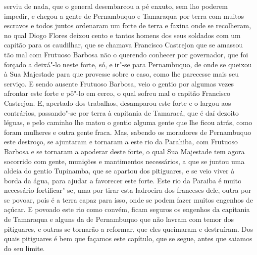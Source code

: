 \begin{linenumbers}
serviu de nada, que o general desembarcou a pé enxuto, sem lho poderem impedir, e chegou a
gente de Pernambuquo e Tamaraqua por terra com muitos escravos e todos juntos ordenaram um
forte de terra e faxina onde se recolheram, no qual Diogo Flores deixou cento e tantos
homens dos seus soldados com um capitão para os caudilhar, que se chamava Francisco
Castrejon que se amassou tão mal com Frutuoso Barbosa não o querendo conhecer por
governador, que foi forçado a deixá"-lo neste forte, só, e ir"-se para Pernambuquo, de onde
se queixou à Sua Majestade para que provesse sobre o caso, como lhe parecesse mais seu
serviço. E sendo ausente Frutuoso Barbosa, veio o gentio por algumas vezes afrontar este
forte e pô"-lo em cerco, o qual sofreu mal o capitão Francisco Castrejon. E, apertado dos
trabalhos, desamparou este forte e o largou aos contrários, passando"-se por terra à
capitania de Tamaracá, que é daí dezoito léguas, e pelo caminho lhe matou o gentio alguma
gente que lhe ficou atrás, como foram mulheres e outra gente fraca. Mas, sabendo os
moradores de Pernambuquo este destroço, se ajuntaram e tornaram a este rio da Parahiba,
com Frutuoso Barbosa e se tornaram a apoderar deste forte, o qual Sua Majestade tem agora
socorrido com gente, munições e mantimentos necessários, a que se juntou uma aldeia do
gentio Tupinamba, que se apartou dos pitiguares, e se veio viver à borda da água, para
ajudar a favorecer este forte. Este rio da Paraiba é muito necessário fortificar"-se, uma
por tirar esta ladroeira dos franceses dele, outra por se povoar, pois é a terra capaz
para isso, onde se podem fazer muitos engenhos de açúcar. E povoado este rio como convém,
ficam seguros os engenhos da capitania de Tamaraqua e alguns da de Pernambuquo que não
lavram com temor dos pitiguares, e outras se tornarão a reformar, que eles queimaram e
destruíram. Dos quais pitiguares é bem que façamos este capítulo, que se segue, antes que
saiamos do seu limite.


\end{linenumbers}
